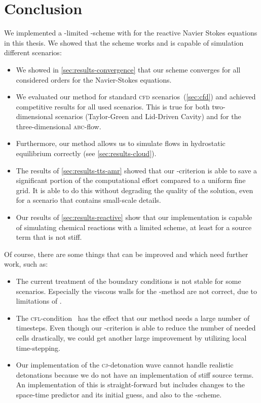 \chapter{Conclusion}\label{chap:conclusion}
We implemented a \muscl{}-limited \aderdg{}-scheme with \amr{} for the reactive Navier Stokes equations in this thesis.
We showed that the scheme works and is capable of simulation different scenarios:
\begin{itemize}
\item We showed in \cref{sec:results-convergence} that our scheme converges for all considered orders for the Navier-Stokes equations.
\item We evaluated our method for standard \textsc{cfd} scenarios~(\cref{sec:cfd}) and achieved competitive results for all used scenarios.
  This is true for both two-dimensional scenarios (Taylor-Green and Lid-Driven Cavity) and for the three-dimensional \textsc{abc}-flow.
\item Furthermore, our method allows us to simulate flows in hydrostatic equilibrium correctly (see \cref{sec:results-cloud}).
\item The results of \cref{sec:results-tts-amr} showed that our \amr{}-criterion is able to save a significant portion of the computational effort compared to a uniform fine grid.
  It is able to do this without degrading the quality of the solution, even for a scenario that contains small-scale details.
\item Our results of \cref{sec:results-reactive} show that our implementation is capable of simulating chemical reactions with a limited scheme, at least for a source term that is not stiff.
\end{itemize}

Of course, there are some things that can be improved and which need further work, such as:
\begin{itemize}
\item The current treatment of the boundary conditions is not stable for some scenarios.
  Especially the viscous walls for the \muscl{}-method are not correct, due to limitations of \exahype{}.
\item The \textsc{cfl}-condition~ has the effect that our method needs a large number of timesteps.
  Even though our \amr{}-criterion is able to reduce the number of needed cells drastically, we could get another large improvement by utilizing local time-stepping.
\item Our implementation of the \textsc{cj}-detonation wave cannot handle realistic detonations because we do not have an implementation of stiff source terms.
  An implementation of this is straight-forward but includes changes to the space-time predictor and its initial guess, and also to the \muscl{}-scheme.
\end{itemize}

